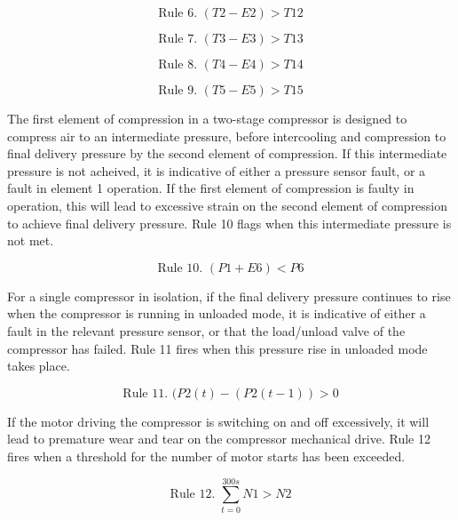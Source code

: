 \begin{equation}
\text{Rule 6. } (T2 - E2) > T12
\label{eq:rule6}
\end{equation}

\begin{equation}
\text{Rule 7. } (T3 - E3) > T13
\label{eq:rule7}
\end{equation}

\begin{equation}
\text{Rule 8. } (T4 - E4) > T14
\label{eq:rule8}
\end{equation}

\begin{equation}
\text{Rule 9. } (T5 - E5) > T15
\label{eq:rule9}
\end{equation}

The first element of compression in a two-stage compressor is designed to compress air to an intermediate pressure, before intercooling and compression to final delivery pressure by the second element of compression. If this intermediate pressure is not acheived, it is indicative of either a pressure sensor fault, or a fault in element 1 operation. If the first element of compression is faulty in operation, this will lead to excessive strain on the second element of compression to achieve final delivery pressure. Rule 10 flags when this intermediate pressure is not met.

\begin{equation}
\text{Rule 10. } (P1 + E6) < P6
\label{eq:rule10}
\end{equation}

For a single compressor in isolation, if the final delivery pressure continues to rise when the compressor is running in unloaded mode, it is indicative of either a fault in the relevant pressure sensor, or that the load/unload valve of the compressor has failed. Rule 11 fires when this pressure rise in unloaded mode takes place.

\begin{equation}
\text{Rule 11. } (P2(t) - (P2(t-1)) > 0
\label{eq:rule11}
\end{equation}

If the motor driving the compressor is switching on and off excessively, it will lead to premature wear and tear on the compressor mechanical drive. Rule 12 fires when a threshold for the number of motor starts has been exceeded.

\begin{equation}
\text{Rule 12. } \sum_{t = 0}^{300s}N1 > N2
\label{eq:rule12}
\end{equation}

